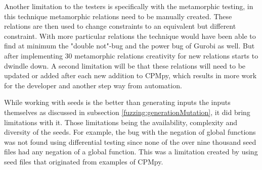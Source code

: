 Another limitation to the testers is specifically with the metamorphic testing, in this technique metamorphic relations need to be manually created. These relations are then used to change constraints to an equivalent but different constraint. With more particular relations the technique would have been able to find at minimum the "double not"-bug and the power bug of Gurobi as well. But after implementing 30 metamorphic relations creativity for new relations starts to dwindle down. A second limitation will be that these relations will need to be updated or added after each new addition to CPMpy, which results in more work for the developer and another step way from automation.


While working with seeds is the better than generating inputs the inputs themselves as discussed in subsection \ref{fuzzing:generationMutation}, it did bring limitations with it. Those limitations being the availability, complexity and diversity of the seeds. For example, the bug with the negation of global functions was not found using differential testing since none of the over nine thousand seed files had any negation of a global function. This was a limitation created by using seed files that originated from examples of CPMpy.




